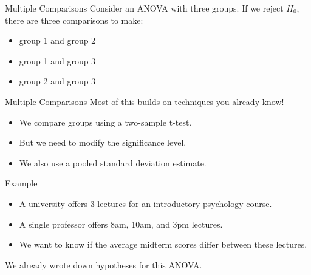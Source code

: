 \begin{frame}{Multiple Comparisons}
    Consider an ANOVA with three groups. If we reject $H_0$, there are three comparisons to make:
    \begin{itemize}
        \item group 1 and group 2
        \item group 1 and group 3
        \item group 2 and group 3
    \end{itemize}
\end{frame}

\begin{frame}{Multiple Comparisons}
    Most of this builds on techniques you already know!
    \begin{itemize}
        \item We compare groups using a two-sample t-test.
        \item But we need to modify the significance level.
        \item We also use a pooled standard deviation estimate.
    \end{itemize}
\end{frame}

\begin{frame}{Example}
    \begin{itemize}
        \item A university offers 3 lectures for an introductory psychology course.
        \item A single professor offers 8am, 10am, and 3pm lectures.
        \item We want to know if the average midterm scores differ between these lectures.
    \end{itemize}
    We already wrote down hypotheses for this ANOVA. 
\end{frame}

